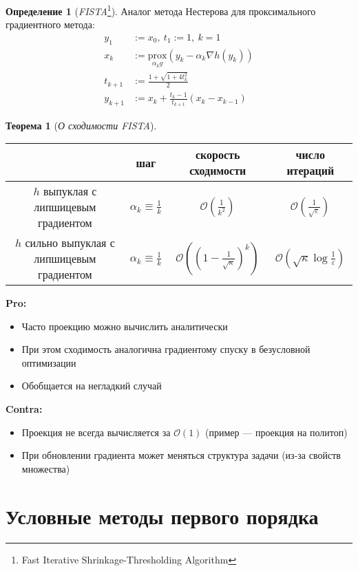 \documentclass[11pt,a4paper]{report}
\def\eps{\varepsilon}
\theoremstyle{definition}
\theoremstyle{definition}
\newtheorem{theorem}{Теорема}[section]
\theoremstyle{definition}
\newtheorem*{definition}{Определение}
\begin{document}
	\begin{definition}[\textit{FISTA}\footnote{Fast Iterative Shrinkage-Thresholding Algorithm}]
		Аналог метода Нестерова для проксимального градиентного метода:
		\begin{align*}
			y_{1} &:= x_{0},\ t_{1} := 1,\ k = 1\\
			x_{k} &:= \underset{\alpha_k g}{\mathrm{prox}}(y_k - \alpha_k \nabla h(y_k))\\
			t_{k+1} &:= \frac{1 + \sqrt{1 + 4t_k^2}}{2}\\
			y_{k+1} &:= x_{k} + \frac{t_k - 1}{t_{k+1}}(x_k - x_{k-1})
		\end{align*}
	\end{definition}
	\begin{theorem}[\textit{О сходимости FISTA}]$  $\\
		\bgroup
		\def\arraystretch{1.5}
		\begin{tabular}{c|c|c|c}
			\hline 
			& шаг & скорость сходимости & число итераций\\
			\hline
			$ h $ выпуклая с липшицевым градиентом & $ \alpha_k \equiv \frac{1}{k} $ & $ \mathcal{O}\left (  \frac{1}{k^2} \right ) $ & $ \mathcal{O}\left (  \frac{1}{\sqrt{\eps}} \right ) $  \\
			\hline
			$ h $ сильно выпуклая с липшицевым градиентом & $ \alpha_k \equiv \frac{1}{k} $ & $ \mathcal{O}\left ( \left ( 1 - \frac{1}{\sqrt{\kappa}} \right )^{k} \right ) $ & $ \mathcal{O}(\sqrt{\kappa} \log \frac{1}{\eps}) $ \\
			\hline 
		\end{tabular}
		\egroup
	\end{theorem}
	\noindent \textbf{Pro:}
	\begin{itemize}[$\diamond$]
		\item Часто проекцию можно вычислить аналитически
		\item При этом сходимость аналогична градиентому спуску в безусловной оптимизации
		\item Обобщается на негладкий случай
	\end{itemize}
	\textbf{Contra:}
	\begin{itemize}[$\diamond$]
		\item Проекция не всегда вычисляется за $ \mathcal{O}(1) $ (пример — проекция на политоп)
		\item При обновлении градиента может меняться структура задачи (из-за свойств множества)
	\end{itemize}
	\section{Условные методы первого порядка}
\end{document}
